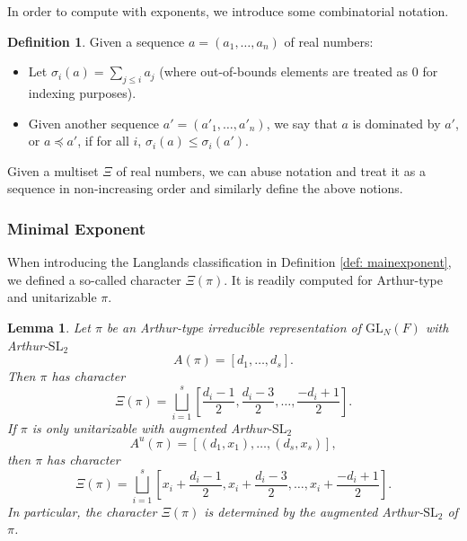 \documentclass{amsart}
\newcommand{\lf}{\left}
\newcommand{\ri}{\right}
\newcommand{\f}{\frac}
\newcommand{\R}{\mathbb R}
\newcommand{\SL}{\mathrm{SL}}
\newcommand{\GL}{\mathrm{GL}}
\newcommand{\1}{\m 1}
\newtheorem{lem}[thm]{Lemma}
\theoremstyle{remark}
\theoremstyle{definition}
\newtheorem{dfn}[thm]{Definition}
\numberwithin{equation}{subsection}
\begin{document}
In order to compute with exponents, we introduce some combinatorial notation. 

\begin{dfn}\label{def: sigma_i}
Given a sequence $a = (a_1, \dotsc, a_n)$ of real numbers: 
\begin{itemize}
\item Let $\sigma_i(a)= \sum_{j\leq i} a_j$ (where out-of-bounds elements are treated as $0$ for indexing purposes). 
\item Given another sequence $a' = (a'_1, \dotsc, a'_n)$, we say that $a$ is dominated by $a'$, or $a \preceq a'$, if for all $i$, $\sigma_i(a) \leq \sigma_i(a')$. 
\end{itemize}
Given a multiset $\Xi$ of real numbers, we can abuse notation and treat it as a sequence in non-increasing order and similarly define the above notions. 
\end{dfn}

\subsubsection{Minimal Exponent}
When introducing the Langlands classification in Definition \ref{def: mainexponent}, we defined a so-called character $\Xi(\pi)$. It is readily computed for Arthur-type and unitarizable $\pi$.

\begin{lem}\label{lem:charactercomputation}
Let $\pi$ be an Arthur-type irreducible representation of $\GL_N(F)$ with Arthur-$\SL_2$
\[
A(\pi) = [d_1, \dotsc, d_s].
\]
Then $\pi$ has character
\[
\Xi(\pi) = \bigsqcup_{i=1}^s \lf[ \f{d_i-1}2, \f{d_i-3}2, \dotsc, \f{-d_i+1}2\ri]. 
\]
If $\pi$ is only unitarizable with augmented Arthur-$\SL_2$ 
\[
A^u(\pi) = [(d_1, x_1), \dotsc, (d_s, x_s)],
\]
then $\pi$ has character 
\[
\Xi(\pi) = \bigsqcup_{i=1}^s \lf[ x_i + \f{d_i-1}2, x_i + \f{d_i-3}2, \dotsc, x_i + \f{-d_i+1}2\ri]. 
\]
In particular, the character $\Xi(\pi)$ is determined by the augmented Arthur-$\SL_2$ of $\pi$.
\end{lem} 
\end{document}
